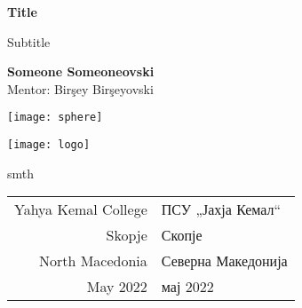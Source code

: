 \begin{titlepage}
	\begin{center}
    	\vspace*{1cm}
		
		\Huge
		\textbf{Title}
		
		\vspace{0.5cm}
		\LARGE
        Subtitle
		
		\vspace{1.5cm}
		
		\textbf{Someone Someoneovski}\\
		{Mentor: Birşey Birşeyovski}
		
		\vfill

		\texttt{[image: sphere]}
		
		\vspace{2cm}
		
		\texttt{[image: logo]}
		
		\Large
		smth\\
		\begin{tabular}{ r | l }
            Yahya Kemal College & ПСУ „Јахја Кемал“\\
            Skopje & Скопје\\
            North Macedonia & Северна Македонија\\
            May 2022 & мај 2022
        \end{tabular}
            
	\end{center}
\end{titlepage}